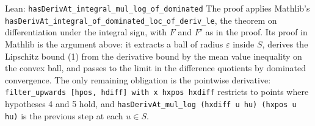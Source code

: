 \documentclass[11pt,a4paper]{article}
\begin{document}
\begin{leanbox}{Lean: \texttt{hasDerivAt\_\allowbreak{}integral\_\allowbreak{}mul\_\allowbreak{}log\_\allowbreak{}of\_\allowbreak{}dominated}}
The proof applies Mathlib's \texttt{has\allowbreak{}Deriv\allowbreak{}At\_\allowbreak{}integral\_\allowbreak{}of\_\allowbreak{}dominated\_\allowbreak{}loc\_\allowbreak{}of\_\allowbreak{}deriv\_\allowbreak{}le}, the theorem on differentiation under the integral sign, with \(F\) and \(F'\) as in the proof. Its proof in Mathlib is the argument above: it extracts a ball of radius \(\varepsilon\) inside \(S\), derives the Lipschitz bound (1) from the derivative bound by the mean value inequality on the convex ball, and passes to the limit in the difference quotients by dominated convergence. The only remaining obligation is the pointwise derivative: \texttt{filter\_\allowbreak{}upwards [hpos, hdiff] with x hxpos hxdiff} restricts to points where hypotheses 4 and 5 hold, and \texttt{has\allowbreak{}Deriv\allowbreak{}At\_\allowbreak{}mul\_\allowbreak{}log (hxdiff u hu) (hxpos u hu)} is the previous step at each \(u\in S\).
\end{leanbox}
\end{document}
